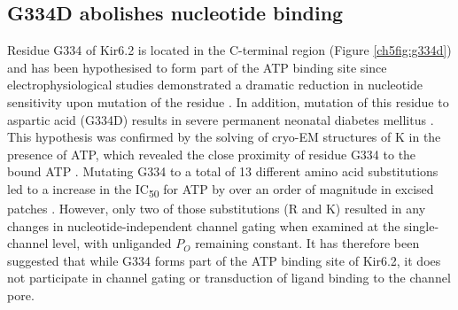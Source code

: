 \subsection{G334D abolishes nucleotide binding}

Residue G334 of Kir6.2 is located in the C-terminal region (Figure \ref{ch5fig:g334d}) and has been hypothesised to form part of the ATP binding site since electrophysiological studies demonstrated a dramatic reduction in nucleotide sensitivity upon mutation of the residue \cite{drain_katp_1998, li_open_2002, li_ligand-dependent_2005}.
In addition, mutation of this residue to aspartic acid (G334D) results in severe permanent neonatal diabetes mellitus \cite{masia_atp-binding_2007-1}.
This hypothesis was confirmed by the solving of cryo-EM structures of K\ATP{} in the presence of ATP, which revealed the close proximity of residue G334 to the bound ATP \cite{lee_molecular_2017, martin_anti-diabetic_2017, li_structure_2017, puljung_cryo-electron_2018-1}.
Mutating G334 to a total of 13 different amino acid substitutions led to a increase in the IC\textsubscript{50} for ATP by over an order of magnitude in excised patches \cite{li_ligand-dependent_2005}.
However, only two of those substitutions (R and K) resulted in any changes in nucleotide-independent channel gating when examined at the single-channel level, with unliganded $P_O$ remaining constant.
It has therefore been suggested that while G334 forms part of the ATP binding site of Kir6.2, it does not participate in channel gating or transduction of ligand binding to the channel pore.

